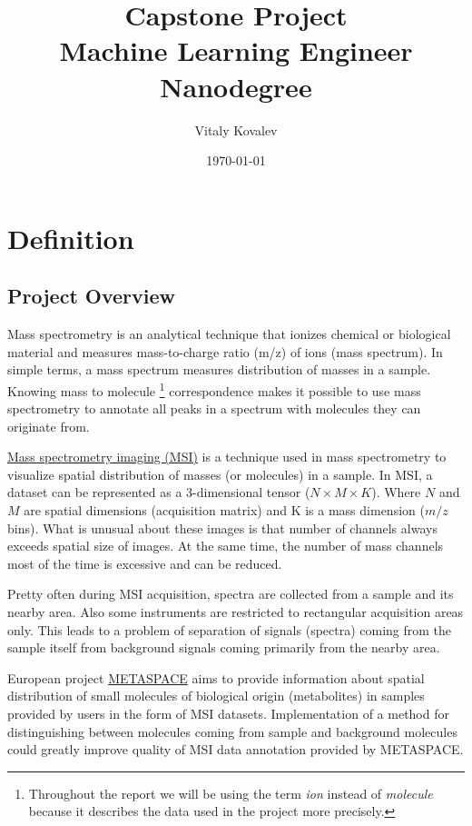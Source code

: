 \documentclass[a4paper]{article}
\title{Capstone Project\\
        \small Machine Learning Engineer Nanodegree}
\author{Vitaly Kovalev}
\date {\today}
\begin{document}
    \maketitle
    
    \section{Definition}
    \subsection*{Project Overview}
    
    Mass spectrometry is an analytical technique that ionizes chemical or biological material and
    measures mass-to-charge ratio (m/z) of ions (mass spectrum). In simple terms, a mass spectrum
    measures distribution of masses in a sample. Knowing mass to molecule
    \footnote{Throughout the report we will be using the term \textit{ion} instead of \textit{molecule}
    because it describes the data used in the project more precisely.}
    correspondence makes it possible to use mass spectrometry to annotate all peaks in a spectrum with
    molecules they can originate from.
    
    \href{https://ms-imaging.org/wp/}{Mass spectrometry imaging (MSI)} is a technique used 
    in mass spectrometry to visualize
    spatial distribution of masses (or molecules) in a sample. In MSI, a dataset can be represented as
    a 3-dimensional tensor ($N \times M \times K$). Where $N$ and $M$ are spatial dimensions
    (acquisition matrix) and K is a mass dimension ($m/z$ bins). What is unusual about these images
    is that number of channels always exceeds spatial size of images. At the same time, the number
    of mass channels most of the time is excessive and can be reduced.
    
    Pretty often during MSI acquisition, spectra are collected from a sample and its nearby area.
    Also some instruments are restricted to rectangular acquisition areas only.
    This leads to a problem of separation of signals (spectra) coming from the sample itself
    from background signals coming primarily from the nearby area.
    
    European project \href{http://metaspace2020.eu}{METASPACE} aims to provide information about
    spatial distribution of small molecules of biological origin (metabolites) in
    samples provided by users in the form of MSI datasets. Implementation of a method for
    distinguishing between molecules coming from sample and background molecules could greatly
    improve quality of MSI data annotation provided by METASPACE.
    
\end{document}

